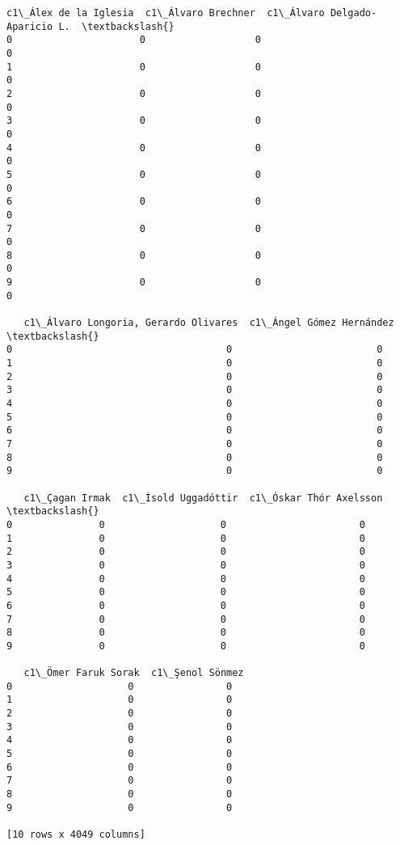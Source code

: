 \documentclass[11pt]{article}
\begin{document}
\begin{tcolorbox}[breakable, size=fbox, boxrule=.5pt, pad at break*=1mm, opacityfill=0]
\begin{Verbatim}[commandchars=\\\{\}]
   c1\_Álex de la Iglesia  c1\_Álvaro Brechner  c1\_Álvaro Delgado-Aparicio L.  \textbackslash{}
0                      0                   0                              0
1                      0                   0                              0
2                      0                   0                              0
3                      0                   0                              0
4                      0                   0                              0
5                      0                   0                              0
6                      0                   0                              0
7                      0                   0                              0
8                      0                   0                              0
9                      0                   0                              0

   c1\_Álvaro Longoria, Gerardo Olivares  c1\_Ángel Gómez Hernández  \textbackslash{}
0                                     0                         0
1                                     0                         0
2                                     0                         0
3                                     0                         0
4                                     0                         0
5                                     0                         0
6                                     0                         0
7                                     0                         0
8                                     0                         0
9                                     0                         0

   c1\_Çagan Irmak  c1\_Ísold Uggadóttir  c1\_Óskar Thór Axelsson  \textbackslash{}
0               0                    0                       0
1               0                    0                       0
2               0                    0                       0
3               0                    0                       0
4               0                    0                       0
5               0                    0                       0
6               0                    0                       0
7               0                    0                       0
8               0                    0                       0
9               0                    0                       0

   c1\_Ömer Faruk Sorak  c1\_Şenol Sönmez
0                    0                0
1                    0                0
2                    0                0
3                    0                0
4                    0                0
5                    0                0
6                    0                0
7                    0                0
8                    0                0
9                    0                0

[10 rows x 4049 columns]
\end{Verbatim}
\end{tcolorbox}
        
\end{document}
